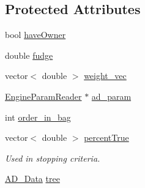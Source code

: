 \subsection*{Protected Attributes}
\begin{DoxyCompactItemize}
\item 
bool \hyperlink{classADTree_a7d81e0601304461d086b9bc134342a36}{haveOwner}
\item 
double \hyperlink{classADTree_a2e99a6dba3ab1a84e7323c8bd0990f02}{fudge}
\item 
vector$<$ double $>$ \hyperlink{classADTree_a3fdcc9137b95113198be7c4861516df0}{weight\_\-vec}
\item 
\hyperlink{classEngineParamReader}{EngineParamReader} $\ast$ \hyperlink{classADTree_a4640db912fa2d1f7c7798466d4a4bdc9}{ad\_\-param}
\item 
int \hyperlink{classADTree_ade70783ee662b06ea7e1030dbd25a978}{order\_\-in\_\-bag}
\item 
vector$<$ double $>$ \hyperlink{classADTree_a506c3976eb2bbfc129bdfe852886c801}{percentTrue}
\begin{DoxyCompactList}\small\item\em Used in stopping criteria. \item\end{DoxyCompactList}\item 
\hyperlink{classAD__Data}{AD\_\-Data} \hyperlink{classADTree_a8bfb36a2d5ded97c2d4ce61046996694}{tree}
\end{DoxyCompactItemize}


